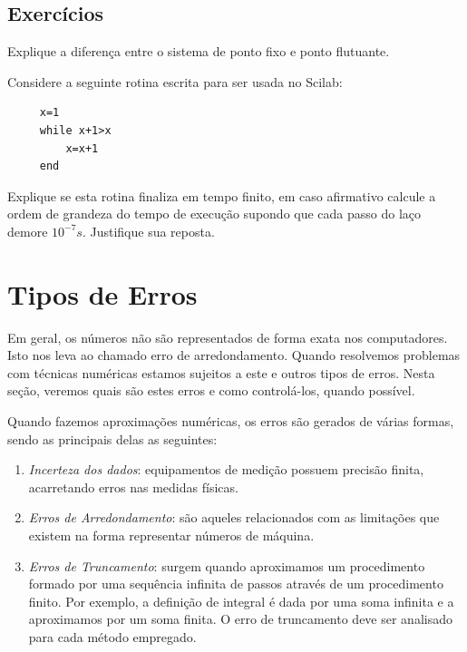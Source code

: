 \subsection{Exercícios}

\begin{Exercise} Explique a diferença entre o sistema de ponto fixo e ponto flutuante.
\end{Exercise}

\ifisscilab
\begin{Exercise}Considere a seguinte rotina escrita para ser usada no Scilab:
 \begin{verbatim}
     x=1
     while x+1>x
         x=x+1
     end
 \end{verbatim}
 Explique se esta rotina finaliza em tempo finito, em caso afirmativo calcule a ordem de grandeza do tempo de execução supondo que cada passo do laço demore $10^{-7}s$. Justifique sua reposta.
 \end{Exercise}
 
\section{Tipos de Erros}

Em geral, os números não são representados de forma exata nos computadores. Isto nos leva ao chamado erro de arredondamento. Quando resolvemos problemas com técnicas numéricas estamos sujeitos a este e outros tipos de erros. Nesta seção, veremos quais são estes erros e como controlá-los, quando possível.

Quando fazemos aproximações numéricas, os erros são gerados de várias formas, sendo as principais delas as seguintes:
\begin{enumerate}
 \item \emph{Incerteza dos dados}: equipamentos de medição possuem precisão finita, acarretando erros nas medidas físicas.
 \item \emph{Erros de Arredondamento}: são aqueles relacionados com as limitações que existem na forma representar números de máquina. 
 \item \emph{Erros de Truncamento}: surgem quando aproximamos um procedimento formado por uma sequência infinita de passos através de um procedimento finito. Por exemplo, a definição de integral é dada por uma soma infinita e a aproximamos por um soma finita. O erro de truncamento deve ser analisado para cada método empregado. 
\end{enumerate}

